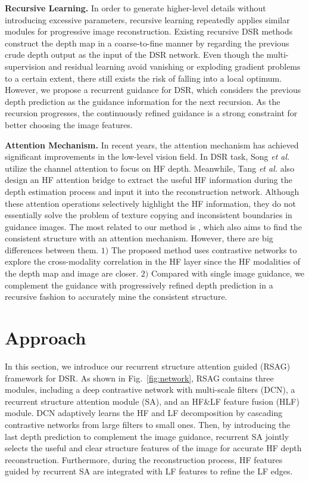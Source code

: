 \documentclass[letterpaper]{article} %
\begin{document}
\textbf{Recursive Learning.}
In order to generate higher-level details without introducing excessive parameters, recursive learning repeatedly applies similar modules for progressive image reconstruction. Existing recursive DSR methods \cite{wen2019deep,yang2019depth,song2020channel} construct the depth map in a coarse-to-fine manner by regarding the previous crude depth output as the input of the DSR network. Even though the multi-supervision and residual learning avoid vanishing or exploding gradient problems to a certain extent, there still exists the risk of falling into a local optimum.
However, we propose a recurrent guidance for DSR, which considers the previous depth prediction as the guidance information for the next recursion. As the recursion progresses, the continuously refined guidance is a strong constraint for better choosing the image features. 
     
\textbf{Attention Mechanism.}
In recent years, the attention mechanism \cite{zhang2019self, guo2020closed, wang2021regularizing} has achieved significant improvements in the low-level vision field.
 In DSR task, Song \textit{et al.} \cite{song2020channel} utilize the channel attention to focus on HF depth. Meanwhile, Tang \textit{et al.} \cite{tang2021bridgenet} also design an HF attention bridge to extract the useful HF information during the depth estimation process and input it into the reconstruction network. 
Although these attention operations selectively highlight the HF information, they do not essentially solve the problem of texture copying and inconsistent boundaries in guidance images. The most related to our method is \cite{zhong2021high}, which also aims to find the consistent structure with an attention mechanism. However, there are big differences between them. $1)$ The proposed method uses contrastive networks to explore the cross-modality  correlation in the HF layer since the HF modalities of the depth map and image are closer.
$2)$ Compared with single image guidance, we complement the guidance with progressively refined depth prediction in a recursive fashion to accurately mine the consistent structure. 


\section{Approach}
In this section, we introduce our recurrent structure attention guided (RSAG) framework for DSR. As shown in Fig.~\ref{fig:network}, RSAG contains three modules, including a deep contrastive network with multi-scale filters (DCN), a recurrent structure attention module (SA), and an HF\&LF feature fusion (HLF) module. DCN adaptively learns the HF and LF decomposition by cascading contrastive networks from large filters to small ones. 
Then, by introducing the last depth prediction to complement the image guidance, recurrent SA jointly selects the useful and clear structure features of the image for accurate HF depth reconstruction. Furthermore, during the reconstruction process, HF features guided by recurrent SA are integrated with LF features to refine the LF edges. 
\end{document}
